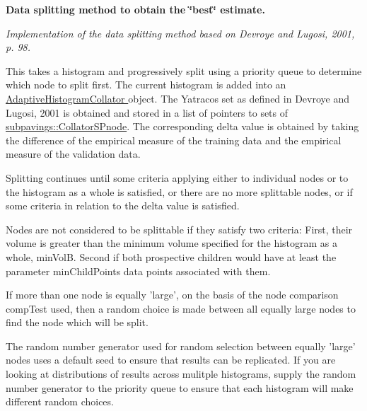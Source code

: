 \begin{Indent}{\bf \-Data splitting method to obtain the \char`\"{}best\char`\"{} estimate.}\par
{\em \-Implementation of the data splitting method based on \-Devroye and \-Lugosi, 2001, p. 98.

\-This takes a histogram and progressively split using a priority queue to determine which node to split first. \-The current histogram is added into an \hyperlink{classsubpavings_1_1AdaptiveHistogramCollator}{\-Adaptive\-Histogram\-Collator } object. \-The \-Yatracos set as defined in \-Devroye and \-Lugosi, 2001 is obtained and stored in a list of pointers to sets of \hyperlink{classsubpavings_1_1CollatorSPnode}{subpavings\-::\-Collator\-S\-Pnode}. \-The corresponding delta value is obtained by taking the difference of the empirical measure of the training data and the empirical measure of the validation data.

\-Splitting continues until some criteria applying either to individual nodes or to the histogram as a whole is satisfied, or there are no more splittable nodes, or if some criteria in relation to the delta value is satisfied.

\-Nodes are not considered to be splittable if they satisfy two criteria\-: \-First, their volume is greater than the minimum volume specified for the histogram as a whole, min\-Vol\-B. \-Second if both prospective children would have at least the parameter min\-Child\-Points data points associated with them.

\-If more than one node is equally 'large', on the basis of the node comparison comp\-Test used, then a random choice is made between all equally large nodes to find the node which will be split.

\-The random number generator used for random selection between equally 'large' nodes uses a default seed to ensure that results can be replicated. \-If you are looking at distributions of results across mulitple histograms, supply the random number generator to the priority queue to ensure that each histogram will make different random choices.


}
\end{Indent}
